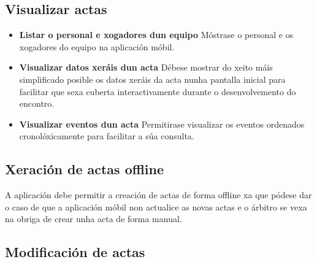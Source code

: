   \subsection{Visualizar actas}

    \begin{itemize}

    \item \textbf{Listar o personal e xogadores dun equipo}
    Móstrase o personal e os xogadores do equipo na aplicación móbil.
    
    \item \textbf{Visualizar datos xeráis dun acta}
    Débese mostrar do xeito máis simplificado posible os datos xeráis da acta 
nunha pantalla inicial para facilitar que sexa cuberta interactivamente durante 
o desenvolvemento do encontro.

    \item \textbf{Visualizar eventos dun acta}
    Permitirase visualizar os eventos ordenados cronolóxicamente para facilitar 
a súa consulta.

    \end{itemize}

  \subsection{Xeración de actas offline}
  A aplicación debe permitir a creación de actas de forma offline xa que pódese 
dar o caso de que a aplicación móbil non actualice as novas actas e o árbitro 
se vexa na obriga de crear unha acta de forma manual.

  \subsection{Modificación de actas}

